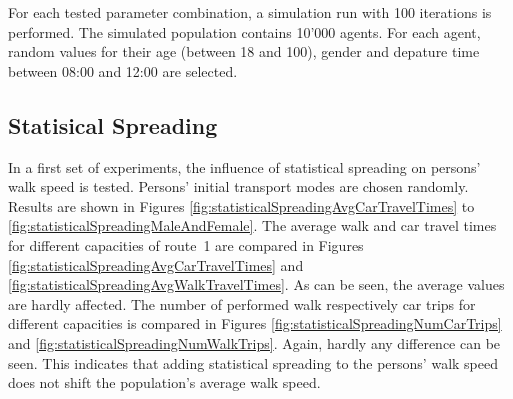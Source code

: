 For each tested parameter combination, a simulation run with 100 iterations is performed. The simulated population contains 10'000 agents. For each agent, random values for their age (between 18 and 100), gender and depature time between 08:00 and 12:00 are selected.

\subsection{Statisical Spreading}
In a first set of experiments, the influence of statistical spreading on persons' walk speed is tested. Persons' initial transport modes are chosen randomly. Results are shown in Figures \ref{fig:statisticalSpreadingAvgCarTravelTimes} to \ref{fig:statisticalSpreadingMaleAndFemale}. The average walk and car travel times for different capacities of route~1 are compared in Figures \ref{fig:statisticalSpreadingAvgCarTravelTimes} and \ref{fig:statisticalSpreadingAvgWalkTravelTimes}. As can be seen, the average values are hardly affected. The number of performed walk respectively car trips  for different capacities is compared in Figures \ref{fig:statisticalSpreadingNumCarTrips} and \ref{fig:statisticalSpreadingNumWalkTrips}. Again, hardly any difference can be seen. This indicates that adding statistical spreading to the persons' walk speed does not shift the population's average walk speed.


